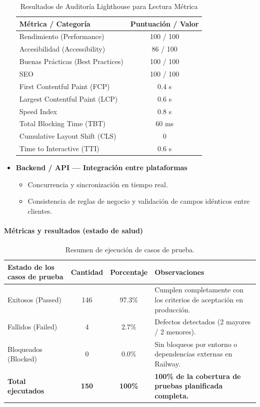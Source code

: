 \documentclass[12pt, atypical, journal]{article}
\begin{document}
\begin{itemize}
\begin{table}[h!]
    \centering
    \caption{Resultados de Auditoría Lighthouse para Lectura Métrica}
    \begin{tabular}{|l|c|}
        \hline
        \textbf{Métrica / Categoría} & \textbf{Puntuación / Valor} \\ \hline
        Rendimiento (Performance) & 100 / 100 \\ \hline
        Accesibilidad (Accessibility) & 86 / 100 \\ \hline
        Buenas Prácticas (Best Practices) & 100 / 100 \\ \hline
        SEO & 100 / 100 \\ \hline
        First Contentful Paint (FCP) & 0.4 s \\ \hline
        Largest Contentful Paint (LCP) & 0.6 s \\ \hline
        Speed Index & 0.8 s \\ \hline
        Total Blocking Time (TBT) & 60 ms \\ \hline
        Cumulative Layout Shift (CLS) & 0 \\ \hline
        Time to Interactive (TTI) & 0.6 s \\ \hline
    \end{tabular}
    \label{tab:lighthouse-metrics}
\end{table}
    \item \textbf{Backend / API — Integración entre plataformas}
    \begin{itemize}
        \item Concurrencia y sincronización en tiempo real.
        \item Consistencia de reglas de negocio y validación de campos idénticos entre clientes.
    \end{itemize}
\end{itemize}

\paragraph{Métricas y resultados (estado de salud)}
\begin{table}[H]
\centering
\small
\renewcommand{\arraystretch}{1.2}
\begin{tabular}{|l|c|c|p{5.5cm}|}
\hline
\textbf{Estado de los casos de prueba} & \textbf{Cantidad} & \textbf{Porcentaje} & \textbf{Observaciones} \\ \hline
Exitosos (Passed) & 146 & 97.3\% & Cumplen completamente con los criterios de aceptación en producción. \\ \hline
Fallidos (Failed) & 4 & 2.7\% & Defectos detectados (2 mayores / 2 menores). \\ \hline
Bloqueados (Blocked) & 0 & 0.0\% & Sin bloqueos por entorno o dependencias externas en Railway. \\ \hline
\textbf{Total ejecutados} & \textbf{150} & \textbf{100\%} & \textbf{100\% de la cobertura de pruebas planificada completa.} \\ \hline
\end{tabular}
\caption{Resumen de ejecución de casos de prueba.}
\label{tab:qa_resultados}
\end{table}
\end{document}
